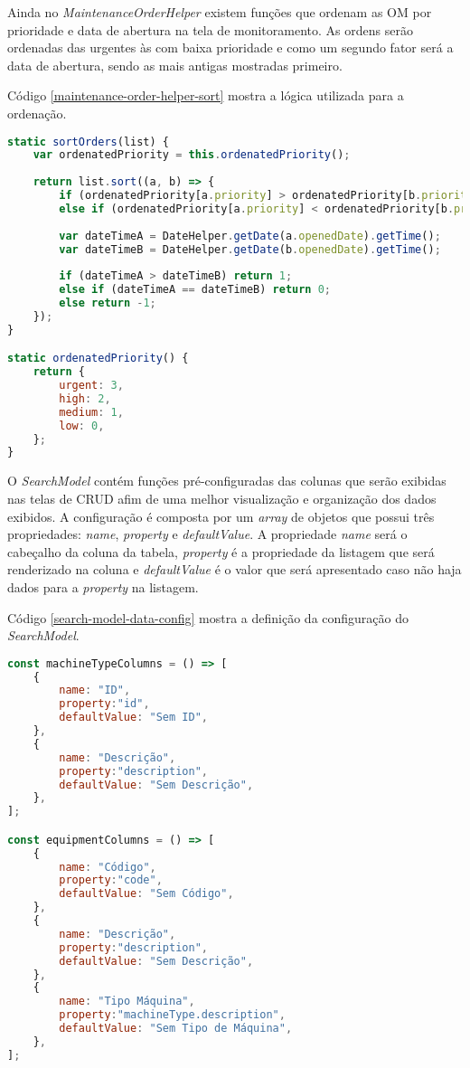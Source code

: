 Ainda no \textit{MaintenanceOrderHelper} existem funções que ordenam as OM por prioridade e data de abertura na tela de monitoramento.
As ordens serão ordenadas das urgentes às com baixa prioridade e como um segundo fator será a data de abertura, sendo as mais antigas mostradas primeiro.

Código \ref{maintenance-order-helper-sort} mostra a lógica utilizada para a ordenação.

\begin{lstlisting}[language=JavaScript, caption={Funções responsáveis pela ordenação}, label={maintenance-order-helper-sort}]
static sortOrders(list) {
	var ordenatedPriority = this.ordenatedPriority();
	
	return list.sort((a, b) => {
		if (ordenatedPriority[a.priority] > ordenatedPriority[b.priority]) return -1;
		else if (ordenatedPriority[a.priority] < ordenatedPriority[b.priority]) return 1;
		
		var dateTimeA = DateHelper.getDate(a.openedDate).getTime();
		var dateTimeB = DateHelper.getDate(b.openedDate).getTime();
		
		if (dateTimeA > dateTimeB) return 1;
		else if (dateTimeA == dateTimeB) return 0;
		else return -1;
	});
}

static ordenatedPriority() {
	return {
		urgent: 3,
		high: 2,
		medium: 1,
		low: 0,
	};
}
\end{lstlisting}

O \textit{SearchModel} contém funções pré-configuradas das colunas que serão exibidas nas telas de CRUD afim de uma melhor visualização e organização dos dados exibidos.
A configuração é composta por um \textit{array} de objetos que possui três propriedades: \textit{name}, \textit{property} e \textit{defaultValue}.
A propriedade \textit{name} será o cabeçalho da coluna da tabela, \textit{property} é a propriedade da listagem que será renderizado na coluna e \textit{defaultValue} é o valor que será apresentado caso não haja dados para a \textit{property} na listagem.

Código \ref{search-model-data-config} mostra a definição da configuração do \textit{SearchModel}.

\begin{lstlisting}[language=JavaScript, caption={Definição da configuração para consulta de dados}, label={search-model-data-config}]
const machineTypeColumns = () => [
	{
		name: "ID",
		property:"id",
		defaultValue: "Sem ID",
	},
	{
		name: "Descrição",
		property:"description",
		defaultValue: "Sem Descrição",
	},
];

const equipmentColumns = () => [
	{
		name: "Código",
		property:"code",
		defaultValue: "Sem Código",
	},
	{
		name: "Descrição",
		property:"description",
		defaultValue: "Sem Descrição",
	},
	{
		name: "Tipo Máquina",
		property:"machineType.description",
		defaultValue: "Sem Tipo de Máquina",
	},
];
\end{lstlisting}

